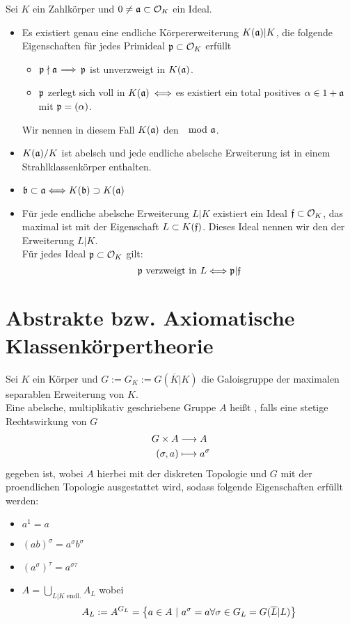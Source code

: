 Sei $K$ ein Zahlkörper und $0\neq \mathfrak{a} \subset \mathcal{O}_K$ ein Ideal.
\begin{itemize}
\item Es existiert genau eine endliche Körpererweiterung $K(\mathfrak{a})|K$, die folgende Eigenschaften für jedes Primideal $\mathfrak{p} \subset \mathcal{O}_K$ erfüllt
\begin{itemize}
\item $\mathfrak{p}\nmid \mathfrak{a}$ $\overset{}{\Longrightarrow}$ $\mathfrak{p}$ ist unverzweigt in $K(\mathfrak{a})$.
\item $\mathfrak{p}$ zerlegt sich voll in $K(\mathfrak{a})$ $\overset{}{\Longleftrightarrow}$ es existiert ein total positives $\alpha \in 1 + \mathfrak{a}$ mit $\mathfrak{p} = (\alpha)$.
\end{itemize}
Wir nennen in diesem Fall $K(\mathfrak{a})$ den  $\mod{\mathfrak{a}}$.
\item $K(\mathfrak{a}) /K$ ist abelsch und jede endliche abelsche Erweiterung ist in einem Strahlklassenkörper enthalten.
\item $\mathfrak{b} \subset \mathfrak{a} \overset{}{\Longleftrightarrow} K(\mathfrak{b}) \supset K(\mathfrak{a})$
\item Für jede endliche abelsche Erweiterung $L|K$ existiert ein Ideal $\mathfrak{f} \subset \mathcal{O}_K$, das maximal ist mit der Eigenschaft $L\subset K(\mathfrak{f})$. Dieses Ideal nennen wir den  der Erweiterung $L|K$.\\
Für jedes Ideal $\mathfrak{p} \subset \mathcal{O}_K$ gilt:
\[ \mathfrak{p} \text{ verzweigt in } L \overset{}{\Longleftrightarrow} \mathfrak{p} | \mathfrak{f} \] 
\end{itemize}

\section{Abstrakte bzw. Axiomatische Klassenkörpertheorie}
Sei $K$ ein Körper und $G := G_K := G(\overline{K}|K)$ die Galoisgruppe der maximalen separablen Erweiterung von $K$.\\
Eine abelsche, multiplikativ geschriebene Gruppe $A$ heißt , falls eine stetige Rechtswirkung von $G$
\begin{align*}
G \times A & \overset{}{\longrightarrow} A\\
(\sigma, a) & \longmapsto a^\sigma
\end{align*}
gegeben ist, wobei $A$ hierbei mit der diskreten Topologie und $G$ mit der proendlichen Topologie ausgestattet wird, sodass folgende Eigenschaften erfüllt werden:
\begin{itemize}
\item $a^1 = a$
\item $(ab)^\sigma = a^\sigma b^\sigma$
\item $(a^\sigma)^\tau = a^{\sigma\tau}$
\item $A = \bigcup_{L|K \text{ endl.}}A_L$ wobei
\[A_L := A^{G_L} = \set{a\in A}{a^\sigma = a \forall \sigma \in G_L = G(\overline{L}|L)}\]
\end{itemize} 

